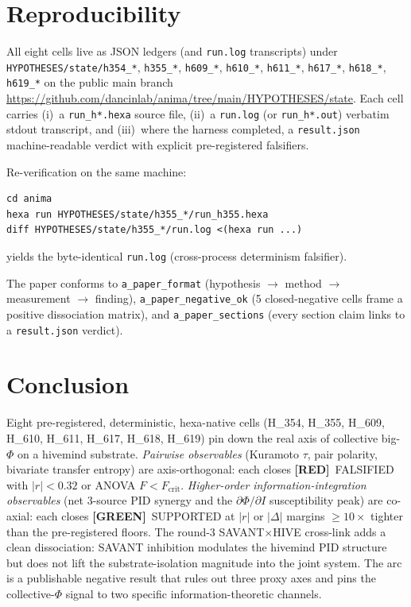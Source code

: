 \documentclass[11pt,a4paper]{article}
\providecommand{\tierGreen}{\textbf{[GREEN]}}
\providecommand{\tierRed}{\textbf{[RED]}}
\begin{document}
\section{Reproducibility}
\label{sec:repro}

All eight cells live as JSON ledgers (and \texttt{run.log}
transcripts) under
\texttt{HYPOTHESES/state/h354\_*}, \texttt{h355\_*},
\texttt{h609\_*}, \texttt{h610\_*}, \texttt{h611\_*},
\texttt{h617\_*}, \texttt{h618\_*}, \texttt{h619\_*}
on the public main branch
\url{https://github.com/dancinlab/anima/tree/main/HYPOTHESES/state}.
Each cell carries
(i)~a \texttt{run\_h*.hexa} source file,
(ii)~a \texttt{run.log} (or \texttt{run\_h*.out}) verbatim stdout
transcript, and
(iii)~where the harness completed, a \texttt{result.json}
machine-readable verdict with explicit pre-registered falsifiers.

Re-verification on the same machine:
\begin{lstlisting}[basicstyle=\ttfamily\small,frame=single,xleftmargin=0pt]
cd anima
hexa run HYPOTHESES/state/h355_*/run_h355.hexa
diff HYPOTHESES/state/h355_*/run.log <(hexa run ...)
\end{lstlisting}
yields the byte-identical \texttt{run.log} (cross-process
determinism falsifier).

The paper conforms to \texttt{a\_paper\_format}
(hypothesis $\to$ method $\to$ measurement $\to$ finding),
\texttt{a\_paper\_negative\_ok} (5 closed-negative cells frame a
positive dissociation matrix), and \texttt{a\_paper\_sections}
(every section claim links to a \texttt{result.json} verdict).

\section{Conclusion}
\label{sec:conclusion}

Eight pre-registered, deterministic, hexa-native cells (H\_354,
H\_355, H\_609, H\_610, H\_611, H\_617, H\_618, H\_619) pin down the
real axis of collective big-$\Phi$ on a hivemind substrate.
\emph{Pairwise observables} (Kuramoto $\tau$, pair polarity,
bivariate transfer entropy) are axis-orthogonal: each closes
\tierRed\ FALSIFIED with $|r|<0.32$ or ANOVA $F<F_{\mathrm{crit}}$.
\emph{Higher-order information-integration observables} (net
3-source PID synergy and the $\partial \Phi / \partial I$
susceptibility peak) are co-axial: each closes \tierGreen\
SUPPORTED at $|r|$ or $|\Delta|$ margins $\geq 10\times$ tighter than
the pre-registered floors. The round-3 SAVANT$\times$HIVE cross-link
adds a clean dissociation: SAVANT inhibition modulates the hivemind
PID structure but does not lift the substrate-isolation magnitude
into the joint system. The arc is a publishable negative result that
rules out three proxy axes and pins the collective-$\Phi$ signal to
two specific information-theoretic channels.
\end{document}
